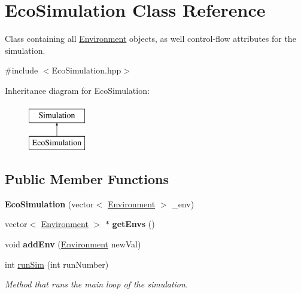 \hypertarget{classEcoSimulation}{}\section{Eco\+Simulation Class Reference}
\label{classEcoSimulation}


Class containing all \hyperlink{classEnvironment}{Environment} objects, as well control-\/flow attributes for the simulation.  




{\ttfamily \#include $<$Eco\+Simulation.\+hpp$>$}

Inheritance diagram for Eco\+Simulation\+:\begin{figure}[H]
\begin{center}
\leavevmode
\includegraphics[height=2.000000cm]{classEcoSimulation}
\end{center}
\end{figure}
\subsection*{Public Member Functions}
\begin{DoxyCompactItemize}
\item 
\hypertarget{classEcoSimulation_a25ae3cf6161e29e0934100e61cfbeff2}{}\label{classEcoSimulation_a25ae3cf6161e29e0934100e61cfbeff2} 
{\bfseries Eco\+Simulation} (vector$<$ \hyperlink{classEnvironment}{Environment} $>$ \+\_\+env)
\item 
\hypertarget{classEcoSimulation_a36abdefbbb5c3e6e06754f23860b9d8c}{}\label{classEcoSimulation_a36abdefbbb5c3e6e06754f23860b9d8c} 
vector$<$ \hyperlink{classEnvironment}{Environment} $>$ $\ast$ {\bfseries get\+Envs} ()
\item 
\hypertarget{classEcoSimulation_a36bafa7e479df22a6ab993f21648817f}{}\label{classEcoSimulation_a36bafa7e479df22a6ab993f21648817f} 
void {\bfseries add\+Env} (\hyperlink{classEnvironment}{Environment} new\+Val)
\item 
int \hyperlink{classEcoSimulation_a72ec5e7dffb4231b2cb363b632788622}{run\+Sim} (int run\+Number)
\begin{DoxyCompactList}\small\item\em Method that runs the main loop of the simulation. \end{DoxyCompactList}\end{DoxyCompactItemize}

